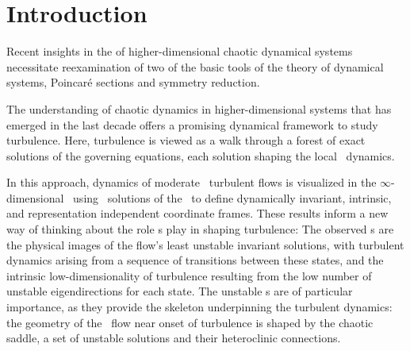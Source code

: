 
\begin{quotation}
\end{quotation}


\section{Introduction}
\label{s:intro}

Recent insights in the of higher-dimensional chaotic dynamical systems
necessitate reexamination of two of the basic tools of the theory of
dynamical systems, Poincar\'e sections and symmetry reduction.

The understanding of chaotic dynamics in higher-dimensional systems that
has emerged in the last decade offers a promising dynamical framework to
study turbulence. Here, turbulence is viewed as a walk through a forest
of exact solutions of the governing equations, each solution shaping the
local \statesp\ dynamics.

In this approach, dynamics of moderate \Reynolds\ turbulent flows is
visualized in the $\infty$-dimensional \stateDsp\  using \eqv\ solutions
of the \NSe\ to define dynamically invariant, intrinsic, and
representation independent coordinate frames.
These results inform a new way of thinking about the role {\recurrStr s}
play in shaping turbulence:
The observed {\cohStr s} are the physical images of the flow's
least unstable invariant solutions, with
turbulent dynamics arising from a sequence of transitions between
these states, and
the intrinsic low-dimensionality of turbulence resulting from the low
number of unstable eigendirections for each state.
The unstable \po s are of particular
importance, as they provide the skeleton underpinning the
turbulent dynamics: the geometry of the \statesp\ flow
near onset of turbulence is shaped by the chaotic saddle, a set of
unstable solutions and their heteroclinic connections.

